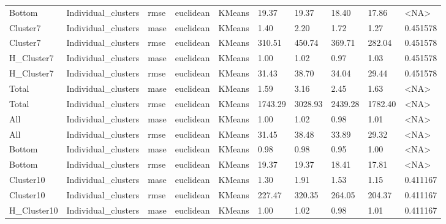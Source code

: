 \begin{tabular}{llllllllll}
     Bottom & Individual\_clusters &   rmse &  euclidean &        KMeans &   19.37 &    19.37 &                 18.40 &         17.86 &      <NA> \\
   Cluster7 & Individual\_clusters &   mase &  euclidean &        KMeans &    1.40 &     2.20 &                  1.72 &          1.27 &  0.451578 \\
   Cluster7 & Individual\_clusters &   rmse &  euclidean &        KMeans &  310.51 &   450.74 &                369.71 &        282.04 &  0.451578 \\
 H\_Cluster7 & Individual\_clusters &   mase &  euclidean &        KMeans &    1.00 &     1.02 &                  0.97 &          1.03 &  0.451578 \\
 H\_Cluster7 & Individual\_clusters &   rmse &  euclidean &        KMeans &   31.43 &    38.70 &                 34.04 &         29.44 &  0.451578 \\
      Total & Individual\_clusters &   mase &  euclidean &        KMeans &    1.59 &     3.16 &                  2.45 &          1.63 &      <NA> \\
      Total & Individual\_clusters &   rmse &  euclidean &        KMeans & 1743.29 &  3028.93 &               2439.28 &       1782.40 &      <NA> \\
        All & Individual\_clusters &   mase &  euclidean &        KMeans &    1.00 &     1.02 &                  0.98 &          1.01 &      <NA> \\
        All & Individual\_clusters &   rmse &  euclidean &        KMeans &   31.45 &    38.48 &                 33.89 &         29.32 &      <NA> \\
     Bottom & Individual\_clusters &   mase &  euclidean &        KMeans &    0.98 &     0.98 &                  0.95 &          1.00 &      <NA> \\
     Bottom & Individual\_clusters &   rmse &  euclidean &        KMeans &   19.37 &    19.37 &                 18.41 &         17.81 &      <NA> \\
  Cluster10 & Individual\_clusters &   mase &  euclidean &        KMeans &    1.30 &     1.91 &                  1.53 &          1.15 &  0.411167 \\
  Cluster10 & Individual\_clusters &   rmse &  euclidean &        KMeans &  227.47 &   320.35 &                264.05 &        204.37 &  0.411167 \\
H\_Cluster10 & Individual\_clusters &   mase &  euclidean &        KMeans &    1.00 &     1.02 &                  0.98 &          1.01 &  0.411167 \\

\end{tabular}
